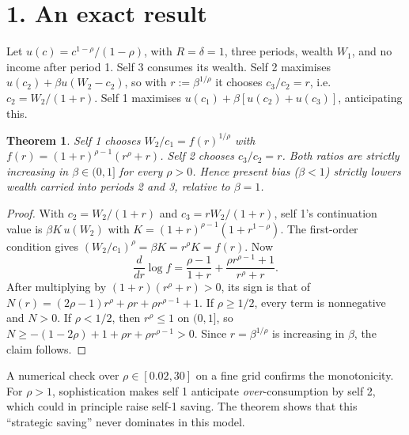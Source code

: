 \documentclass[11pt]{article}
\newtheorem{theorem}{Theorem}
\theoremstyle{definition}
\begin{document}
\section*{1. An exact result}
Let $u(c)=c^{1-\rho}/(1-\rho)$, with $R=\delta=1$, three periods, wealth $W_1$, and no income after period 1. Self 3
consumes its wealth. Self 2 maximises $u(c_2)+\beta u(W_2-c_2)$, so with $r:=\beta^{1/\rho}$ it chooses
$c_3/c_2=r$, i.e.\ $c_2=W_2/(1+r)$. Self 1 maximises $u(c_1)+\beta[u(c_2)+u(c_3)]$, anticipating this.
\begin{theorem}\label{thm:three}
Self 1 chooses $W_2/c_1=f(r)^{1/\rho}$ with $f(r)=(1+r)^{\rho-1}(r^\rho+r)$. Self 2 chooses $c_3/c_2=r$. Both ratios are
strictly increasing in $\beta\in(0,1]$ for every $\rho>0$. Hence present bias ($\beta<1$) strictly lowers wealth carried into
periods 2 and 3, relative to $\beta=1$.
\end{theorem}
\begin{proof}
With $c_2=W_2/(1+r)$ and $c_3=rW_2/(1+r)$, self 1's continuation value is $\beta K\,u(W_2)$ with
$K=(1+r)^{\rho-1}(1+r^{1-\rho})$. The first-order condition gives $(W_2/c_1)^\rho=\beta K=r^\rho K=f(r)$. Now
\[
\frac{d}{dr}\log f=\frac{\rho-1}{1+r}+\frac{\rho r^{\rho-1}+1}{r^\rho+r}.
\]
After multiplying by $(1+r)(r^\rho+r)>0$, its sign is that of $N(r)=(2\rho-1)r^\rho+\rho r+\rho r^{\rho-1}+1$. If
$\rho\ge1/2$, every term is nonnegative and $N>0$. If $\rho<1/2$, then $r^\rho\le1$ on $(0,1]$, so
$N\ge-(1-2\rho)+1+\rho r+\rho r^{\rho-1}>0$. Since $r=\beta^{1/\rho}$ is increasing in $\beta$, the claim follows.
\end{proof}
A numerical check over $\rho\in[0.02,30]$ on a fine grid confirms the monotonicity. For $\rho>1$, sophistication makes self 1 anticipate
\emph{over}-consumption by self 2, which could in principle raise self-1 saving. The theorem shows that this
``strategic saving'' never dominates in this model.
\end{document}
